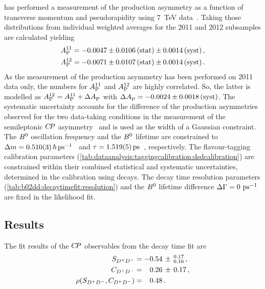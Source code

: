 \lhcb has performed a measurement of the production asymmetry as a function
of transverse momentum and pseudorapidity using \SI{7}{\TeV}
data~\cite{LHCb-PAPER-2014-042}. Taking those distributions from \BdToDD
individual weighted averages for the 2011 and 2012 subsamples are calculated
yielding
%
\begin{equation}
  \begin{split}
    A_\text{P}^{11} &= -0.0047 \pm 0.0106 \,\text{(stat)} \pm 0.0014 \, \text{(syst)} \,, \\
    A_\text{P}^{12} &= -0.0071 \pm 0.0107 \,\text{(stat)} \pm 0.0014 \, \text{(syst)} \,.
  \end{split}
\end{equation}
%
As the measurement of the production asymmetry has been performed on 2011 data
only, the numbers for $A_\text{P}^{11}$ and $A_\text{P}^{12}$ are highly
correlated. So, the latter is modelled as $A_\text{P}^{12} = A_\text{P}^{11} +
\Delta A_\text{P}^{}$ with $\Delta A_\text{P}^{} = -0.0024 \pm 0.0018
\,\text{(syst)}$. The systematic uncertainty accounts for the difference of
the production asymmetries observed for the two data-taking conditions in the
measurement of the semileptonic ${C\!P}$ asymmetry~\cite{LHCb-PAPER-2014-053} and
is used as the width of a Gaussian constraint. The ${{B}^0}$ oscillation frequency and
the ${{B}^0}$ lifetime are constrained to $\dm =
\SI{0.510\pm0.003}{\planckbar\invps}$~\cite{PDG2014} and $\tau =
\SI{1.519\pm0.005}{\ps}$~\cite{PDG2014}, respectively. The
flavour-tagging calibration parameters
(\cref{tab:dataanalysis:taggingcalibration:dsdcalibration}) are constrained
within their combined statistical and systematic uncertainties, determined in
the calibration using \BdToDsD decays. The decay time resolution parameters
(\cref{tab:b02dd:decaytimefit:resolution}) and the ${{B}^0}$ lifetime difference
${\Delta\Gamma} = \SI{0}{\ensuremath{{\mathrm{ \,ps^{-1}}}}}$ are fixed in the likelihood fit.

\subsection{Results}

The fit results of the ${C\!P}$ observables from the decay time fit are
\begin{align}
\begin{split}
  S_{{{D}^+}{{D}^-}}                &= -0.54\,\pm\,^{0.17}_{0.16} \, , \\
  C_{{{D}^+}{{D}^-}}                &= \phantom{-}0.26\,\pm\,0.17 \, , \\
  \rho(S_{{{D}^+}{{D}^-}},C_{{{D}^+}{{D}^-}})     &= \phantom{-}0.48 \, . \\
\end{split}
\label{eq:b02dd:decaytimefit:cpresults}
\end{align}

